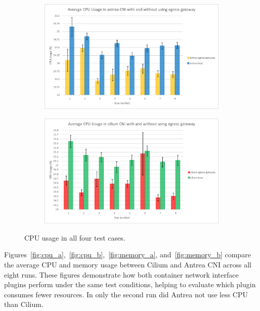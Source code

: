 \begin{figure}[H]
    \begin{subfigure}[b]{0.45\textwidth}
        \includegraphics[width=\textwidth]{plots/small/cpu_antrea.png}
        \caption{}
        \label{fig:cpu_c}
    \end{subfigure}
    \hfill
    \begin{subfigure}[b]{0.45\textwidth}
        \includegraphics[width=\textwidth]{plots/small/cpu_cilium.png}
        \caption{}
        \label{fig:cpu_d}
    \end{subfigure}
    
    \caption{CPU usage in all four test cases.}
    \label{fig:cpuFour}
\end{figure}
Figures~\ref{fig:cpu_a},~\ref{fig:cpu_b},~\ref{fig:memory_a}, and~\ref{fig:memory_b} compare the average CPU and memory usage between Cilium and Antrea CNI across all eight runs. These figures demonstrate how both container network interface plugins perform under the same test conditions, helping to evaluate which plugin consumes fewer resources. In only the second run did Antrea not use less CPU than Cilium.
